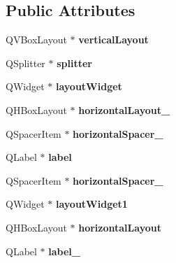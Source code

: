 \subsection*{Public Attributes}
\begin{DoxyCompactItemize}
\item 
\mbox{\label{class_ui___confi_game_a9d363c6ed09a212a6d177ba242f013ff}} 
Q\+V\+Box\+Layout $\ast$ {\bfseries vertical\+Layout}
\item 
\mbox{\label{class_ui___confi_game_a5bb98ee741b950c5b5922381f1372eaa}} 
Q\+Splitter $\ast$ {\bfseries splitter}
\item 
\mbox{\label{class_ui___confi_game_a2b3ae0d8be0048ca43acbced015e2cb8}} 
Q\+Widget $\ast$ {\bfseries layout\+Widget}
\item 
\mbox{\label{class_ui___confi_game_a568a0c2cca7f108e493cfd5f01226a40}} 
Q\+H\+Box\+Layout $\ast$ {\bfseries horizontal\+Layout\+\_}
\item 
\mbox{\label{class_ui___confi_game_a8369ba18784961cf644016b33517f2bd}} 
Q\+Spacer\+Item $\ast$ {\bfseries horizontal\+Spacer\+\_}
\item 
\mbox{\label{class_ui___confi_game_a0b14e78209585126e9b54410c5379c99}} 
Q\+Label $\ast$ {\bfseries label}
\item 
\mbox{\label{class_ui___confi_game_a7eba40b5089bd5edf0e42b84deb508b4}} 
Q\+Spacer\+Item $\ast$ {\bfseries horizontal\+Spacer\+\_}
\item 
\mbox{\label{class_ui___confi_game_ac8af83598f11a90542e8c5161ef445e6}} 
Q\+Widget $\ast$ {\bfseries layout\+Widget1}
\item 
\mbox{\label{class_ui___confi_game_ab0ccf8ea2f5a2ca6628f51de239b6ce3}} 
Q\+H\+Box\+Layout $\ast$ {\bfseries horizontal\+Layout}
\item 
\mbox{\label{class_ui___confi_game_a931d8e9d8bad8b79445f6428b99f4974}} 
Q\+Label $\ast$ {\bfseries label\+\_}

\end{DoxyCompactItemize}
